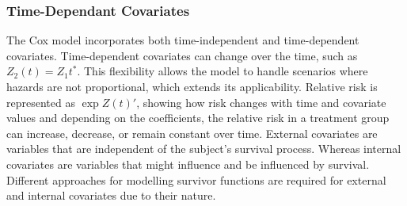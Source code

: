 \subsubsection{Time-Dependant Covariates}
\noindent The Cox model incorporates both time-independent and time-dependent covariates. \parencite{kalbfleisch_fifty_2023} Time-dependent covariates can change over the time, such as \(Z_{2}(t) = Z_{1}t^{*}\). This flexibility allows the model to handle scenarios where hazards are not proportional, which extends its applicability. Relative risk is represented as \(\exp{Z(t)'}\), showing how risk changes with time and covariate values and depending on the coefficients, the relative risk in a treatment group can increase, decrease, or remain constant over time. \parencite{kalbfleisch_fifty_2023} External covariates are variables that are independent of the subject's survival process. Whereas internal covariates are variables that might influence and be influenced by survival. \parencite{kalbfleisch_fifty_2023} Different approaches for modelling survivor functions are required for external and internal covariates due to their nature.

